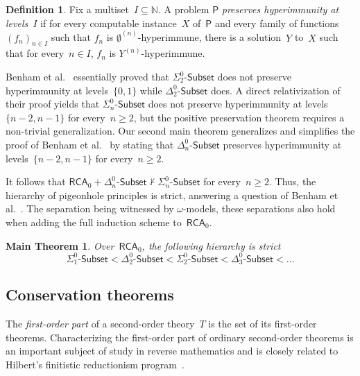 \documentclass{article}
\def\NN{\mathbb{N}}
\def\Psf{\mathsf{P}}
\newcommand{\Sub}[1]{{#1}\mbox{-}\mathsf{Subset}}
\newcommand{\RCA}{\mathsf{RCA}}
\numberwithin{theorem}{section}
\newtheorem{maintheorem}[theorem]{Main Theorem}
\theoremstyle{definition}
\newtheorem{definition}[theorem]{Definition}
\begin{document}
\begin{definition}
Fix a multiset~$I \subseteq \NN$. A problem $\Psf$ \emph{preserves hyperimmunity at levels~$I$} if for every computable instance~$X$ of~$\Psf$ and every family of functions $(f_n)_{n \in I}$ such that $f_n$ is $\emptyset^{(n)}$-hyperimmune, there is a solution~$Y$ to~$X$ such that for every~$n \in I$, $f_n$ is $Y^{(n)}$-hyperimmune.
\end{definition}

Benham et al.~\cite{benham2024ginsburg} essentially proved that $\Sub{\Sigma^0_2}$ does not preserve hyper\-immunity at levels~$\{0,1\}$ while $\Sub{\Delta^0_2}$ does. A direct relativization of their proof yields that $\Sub{\Sigma^0_n}$ does not preserve hyperimmunity at levels~$\{n-2,n-1\}$ for every~$n \geq 2$, but the positive preservation theorem requires a non-trivial generalization. Our second main theorem generalizes and simplifies the proof of Benham et al.~\cite{benham2024ginsburg} by stating that $\Sub{\Delta^0_n}$ preserves hyperimmunity at levels~$\{n-2,n-1\}$ for every~$n \geq 2$.


It follows that $\RCA_0 + \Sub{\Delta^0_n} \nvdash \Sub{\Sigma^0_n}$ for every~$n \geq 2$. Thus, the hierarchy of pigeonhole principles is strict, answering a question of Benham et al.~\cite{benham2024ginsburg}. The separation being witnessed by $\omega$-models, these separations also hold when adding the full induction scheme to~$\RCA_0$.

\begin{maintheorem}
Over~$\RCA_0$, the following hierarchy is strict
$$\Sub{\Sigma^0_1} < \Sub{\Delta^0_2} < \Sub{\Sigma^0_2} < \Sub{\Delta^0_3} < \dots $$
\end{maintheorem}

\subsection{Conservation theorems}

The \emph{first-order part} of a second-order theory~$T$ is the set of its first-order theorems.
Characterizing the first-order part of ordinary second-order theorems is an important subject of study in reverse mathematics and is closely related to Hilbert's finitistic reductionism program~\cite{simpson1988partial}.
\end{document}

